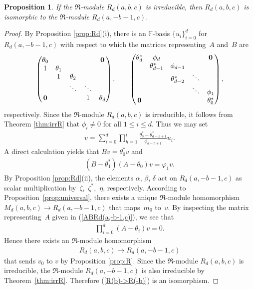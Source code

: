 \documentclass[pdftex]{sigma}
\def\F{\mathbb F}
\numberwithin{equation}{section}
\newtheorem{Proposition}[Theorem]{Proposition}
 { \theoremstyle{definition}
\newtheorem{Definition}[Theorem]{Definition}
\newtheorem{Example}[Theorem]{Example} }
\begin{document}
\begin{Proposition}\label{prop:iso3}If the $\Re$-module $R_d(a,b,c)$ is irreducible, then $R_d(a,b,c)$ is isomorphic to the $\Re$-module $R_d(a,-b-1,c)$.
\end{Proposition}
\begin{proof}By Proposition \ref{prop:Rd}(i), there is an $\F$-basis $\{u_i\}_{i=0}^d$ for $R_d(a,-b-1,c)$ with respect to which the matrices representing~$A$ and~$B$ are
\begin{gather}\label{ABRd(a,-b-1,c)}
\begin{pmatrix}
\theta_0 & & & &{\bf 0}
\\
1 &\theta_1
\\
&1 &\theta_2
 \\
& &\ddots &\ddots
 \\
{\bf 0} & & &1 &\theta_d
\end{pmatrix},
\qquad
\begin{pmatrix}
\theta_d^* &\phi_d & & &{\bf 0}
\\
 &\theta_{d-1}^* &\phi_{d-1}
\\
 & &\theta_{d-2}^* &\ddots
 \\
 & & &\ddots &\phi_1
 \\
{\bf 0} & & & &\theta_0^*
\end{pmatrix},
\end{gather}
respectively. Since the $\Re$-module $R_d(a,b,c)$ is irreducible, it follows from Theorem \ref{thm:irrR} that $\phi_i\not=0$ for all $1\leq i\leq d$. Thus we may set
\begin{gather*}
v=\sum_{i=0}^d
\prod_{h=1}^i
\frac{\theta_0^*-\theta_{d-h+1}^*}{\phi_{d-h+1}} u_i.
\end{gather*}
A direct calculation yields that $Bv=\theta_0^* v$ and
\begin{gather*}
(B-\theta_1^*)(A-\theta_0) v
=\varphi_1 v.
\end{gather*}
By Proposition \ref{prop:Rd}(ii), the elements $\alpha$, $\beta$, $\delta$ act on $R_d(a,-b-1,c)$ as scalar multiplication by~$\zeta$,~$\zeta^*$,~$\eta$, respectively. According to Proposition~\ref{prop:universal}, there exists a unique $\Re$-module homomorphism $M_d(a,b,c)\to R_d(a,-b-1,c)$ that maps~$m_0$ to~$v$.
By inspecting the matrix representing~$A$ given in (\ref{ABRd(a,-b-1,c)}), we see that
\begin{gather*}
\prod_{i=0}^d (A-\theta_i)v=0.
\end{gather*}
Hence there exists an $\Re$-module homomorphism
\begin{gather}\label{R(b)->R(-b)}
R_d(a,b,c)\to R_d(a,-b-1,c)
\end{gather}
that sends $v_0$ to $v$ by Proposition \ref{prop:R}. Since the $\Re$-module $R_d(a,b,c)$ is irreducible, the $\Re$-module $R_d(a,-b-1,c)$ is also irreducible by Theorem~\ref{thm:irrR}. Therefore (\ref{R(b)->R(-b)}) is an isomorphism.
\end{proof}
\end{document}
